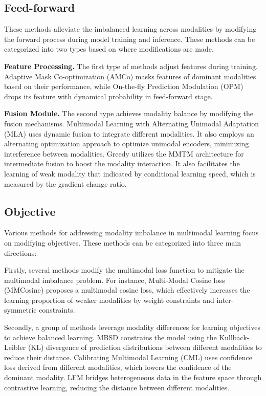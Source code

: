 \subsection{Feed-forward}
These methods alleviate the imbalanced learning across modalities by modifying the forward process during model training and inference. These methods can be categorized into two types based on where modifications are made.

\textbf{Feature Processing.} The first type of methods adjust features during training. Adaptive Mask Co-optimization (AMCo) \cite{AMCo} masks features of dominant modalities based on their performance, while On-the-fly Prediction Modulation (OPM) \cite{OPM_PAMI} drops its feature with dynamical probability in feed-forward stage.

\textbf{Fusion Module.} The second type achieves modality balance by modifying the fusion mechanisms. Multimodal Learning with Alternating Unimodal Adaptation (MLA) \cite{MLA} uses dynamic fusion to integrate different modalities. It also employs an alternating optimization approach to optimize unimodal encoders, minimizing interference between modalities. Greedy \cite{Greedy_Wu} utilizes the MMTM \cite{MMTM_Joze} architecture for intermediate fusion to boost the modality interaction. It also facilitates the learning of weak modality that indicated by conditional learning speed, which is measured by the gradient change ratio.

\subsection{Objective}
Various methods for addressing modality imbalance in multimodal learning focus on modifying objectives. These methods can be categorized into three main directions: 

Firstly, several methods modify the multimodal loss function to mitigate the multimodal imbalance problem. For instance, Multi-Modal Cosine loss (MMCosine) \cite{MMCosine_Xu} proposes a multimodal cosine loss, which effectively increases the learning proportion of weaker modalities by weight constraints and inter-symmetric constraints.

Secondly, a group of methods leverage modality differences for learning objectives to achieve balanced learning. MBSD \cite{MBSD} constrains the model using the Kullback-Leibler (KL) \cite{KL} divergence of prediction distributions between different modalities to reduce their distance. Calibrating Multimodal Learning (CML) \cite{CML_Ma} uses confidence loss derived from different modalities, which lowers the confidence of the dominant modality. LFM \cite{LFM_yang} bridges heterogeneous data in the feature space through contrastive learning, reducing the distance between different modalities.

